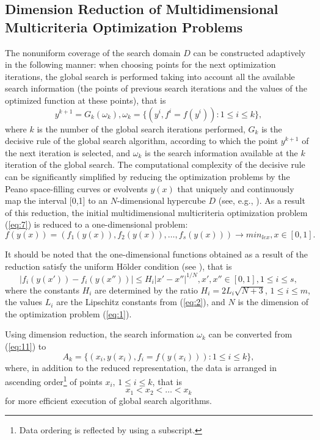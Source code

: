 \documentclass[smallextended]{svjour3}       %
\begin{document}
\subsection{Dimension Reduction of Multidimensional Multicriteria Optimization Problems}

The nonuniform coverage of the search domain $D$ can be constructed adaptively in the following manner: when choosing points for the next optimization iterations, the global search is performed taking into account all the available search information (the points of previous search iterations and the values of the optimized function at these points), that is
\begin{equation}\label{eq:11}
y^{k+1}=G_k(\omega_k), \omega_k=\{(y^i,f^i=f(y^i)): 1 \leq i \leq k \},
\end{equation}
where $k$ is the number of the global search iterations performed, $G_k$ is the decisive rule of the global search algorithm, according to which the point $y^{k+1}$ of the next iteration is selected, and $\omega_k$ is the search information available at the $k$ iteration of the global search. The computational complexity of the decisive rule can be significantly simplified by reducing the optimization problems by the Peano space-filling curves or evolvents $y(x)$ that uniquely and continuously map the interval [0,1] to an $N$-dimensional hypercube $D$ (see, e.g., \cite{c17,c18,c23}). As a result of this reduction, the initial multidimensional multicriteria optimization problem (\ref{eq:7}) is reduced to a one-dimensional problem:
\begin{equation}\label{eq:12}
f(y(x)) = (f_1(y(x)), f_2(y(x)), \dots, f_s(y(x))) \to min_{lex},  x \in [0,1].
\end{equation}

It should be noted that the one-dimensional functions obtained as a result of the reduction satisfy the uniform H\"older condition (see \cite{c17,c18}), that is
\begin{equation}\label{eq:13}
|f_i (y(x'))-f_i (y(x''))| \leq H_i |x'-x''|^{1/N}, x',x''\in [0,1], 1 \leq i \leq s,
\end{equation}
where the constants $H_i$ are determined by the ratio $H_i=2L_i\sqrt{N+3}$,  $1 \leq i \leq m$, the values $L_i$ are the Lipschitz constants from (\ref{eq:2}), and $N$ is the dimension of the optimization problem (\ref{eq:1}).

Using dimension reduction, the search information $\omega_k$ can be converted from (\ref{eq:11}) to 
\begin{equation}\label{eq:14}
A_k=\{(x_i, y(x_i), f_i=f(y(x_i))): 1 \leq i \leq k \},
\end{equation}
where, in addition to the reduced representation, the data is arranged in ascending order\footnote{Data ordering is reflected by using a subscript.} of points $x_i$, $1 \leq i \leq k$, that is
\begin{equation} \label{eq:15}
x_1 < x_2 < \dots < x_k	
\end{equation}
for more efficient execution of global search algorithms.
\end{document}
